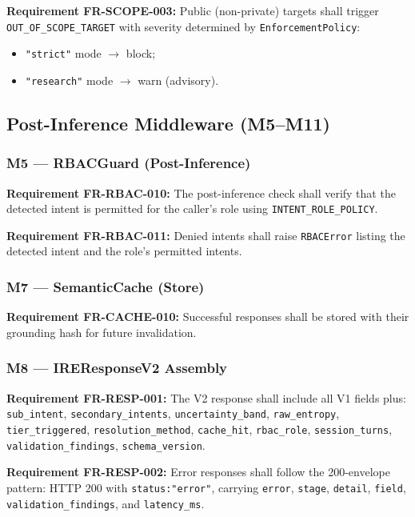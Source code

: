 \documentclass[10pt,journal,onecolumn]{IEEEtran}
\newcommand{\reqid}[1]{\textbf{#1}}
\begin{document}
\reqid{Requirement FR-SCOPE-003:} Public (non-private) targets shall trigger \texttt{OUT\_OF\_SCOPE\_TARGET} with severity determined by \texttt{EnforcementPolicy}:
\begin{itemize}
\item \texttt{"strict"} mode $\rightarrow$ block;
\item \texttt{"research"} mode $\rightarrow$ warn (advisory).
\end{itemize}

\subsection{Post-Inference Middleware (M5--M11)}

\subsubsection{M5 --- RBACGuard (Post-Inference)}
\reqid{Requirement FR-RBAC-010:} The post-inference check shall verify that the detected intent is permitted for the caller's role using \texttt{INTENT\_ROLE\_POLICY}.

\reqid{Requirement FR-RBAC-011:} Denied intents shall raise \texttt{RBACError} listing the detected intent and the role's permitted intents.

\subsubsection{M7 --- SemanticCache (Store)}
\reqid{Requirement FR-CACHE-010:} Successful responses shall be stored with their grounding hash for future invalidation.

\subsubsection{M8 --- IREResponseV2 Assembly}
\reqid{Requirement FR-RESP-001:} The V2 response shall include all V1 fields plus: \texttt{sub\_intent}, \texttt{secondary\_intents}, \texttt{uncertainty\_band}, \texttt{raw\_entropy}, \texttt{tier\_triggered}, \texttt{resolution\_method}, \texttt{cache\_hit}, \texttt{rbac\_role}, \texttt{session\_turns}, \texttt{validation\_findings}, \texttt{schema\_version}.

\reqid{Requirement FR-RESP-002:} Error responses shall follow the 200-envelope pattern: HTTP 200 with \texttt{status:"error"}, carrying \texttt{error}, \texttt{stage}, \texttt{detail}, \texttt{field}, \texttt{validation\_findings}, and \texttt{latency\_ms}.
\end{document}
